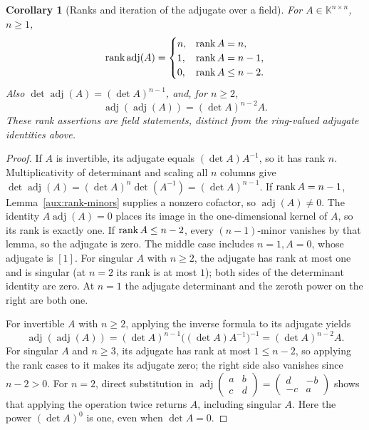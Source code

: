 \documentclass[11pt,a4paper]{book}
\newtheorem{corollary}[theorem]{Corollary}
\theoremstyle{definition}\newtheorem{definition}[theorem]{Definition}
\theoremstyle{remark}\newtheorem{remark}[theorem]{Remark}
\newcommand{\K}{\mathbb K}\newcommand{\R}{\mathbb R}\newcommand{\C}{\mathbb C}
\begin{document}
\begin{corollary}[Ranks and iteration of the adjugate over a field]
For $A\in\K^{n\times n}$, $n\ge1$,
\[
\operatorname{rank}\operatorname{adj}(A)=
\begin{cases}
n,&\operatorname{rank} A=n,\\
1,&\operatorname{rank} A=n-1,\\
0,&\operatorname{rank} A\le n-2.
\end{cases}
\]
Also $\det\operatorname{adj}(A)=(\det A)^{n-1}$, and, for $n\ge2$,
\[
\operatorname{adj}(\operatorname{adj}(A))=(\det A)^{n-2}A.
\]
These rank assertions are field statements, distinct from the ring-valued adjugate identities above.
\end{corollary}
\begin{proof}
If $A$ is invertible, its adjugate equals $(\det A)A^{-1}$, so it has rank $n$. Multiplicativity of determinant and scaling all $n$ columns give
$\det\operatorname{adj}(A)=(\det A)^n\det(A^{-1})=(\det A)^{n-1}$.
If $\operatorname{rank} A=n-1$, Lemma~\ref{aux:rank-minors} supplies a nonzero cofactor, so $\operatorname{adj}(A)\ne0$. The identity $A\operatorname{adj}(A)=0$ places its image in the one-dimensional kernel of $A$, so its rank is exactly one. If $\operatorname{rank} A\le n-2$, every $(n-1)$-minor vanishes by that lemma, so the adjugate is zero. The middle case includes $n=1,A=0$, whose adjugate is $[1]$. For singular $A$ with $n\ge2$, the adjugate has rank at most one and is singular (at $n=2$ its rank is at most $1$); both sides of the determinant identity are zero. At $n=1$ the adjugate determinant and the zeroth power on the right are both one.

For invertible $A$ with $n\ge2$, applying the inverse formula to its adjugate yields
\[
\operatorname{adj}(\operatorname{adj}(A))
 = (\det A)^{n-1}\bigl((\det A)A^{-1}\bigr)^{-1}
 = (\det A)^{n-2}A.
\]
For singular $A$ and $n\ge3$, its adjugate has rank at most $1\le n-2$, so applying the rank cases to it makes its adjugate zero; the right side also vanishes since $n-2>0$. For $n=2$, direct substitution in
$\operatorname{adj}\begin{pmatrix}a&b\\c&d\end{pmatrix}=\begin{pmatrix}d&-b\\-c&a\end{pmatrix}$
shows that applying the operation twice returns $A$, including singular $A$. Here the power $(\det A)^0$ is one, even when $\det A=0$.
\end{proof}
\end{document}
